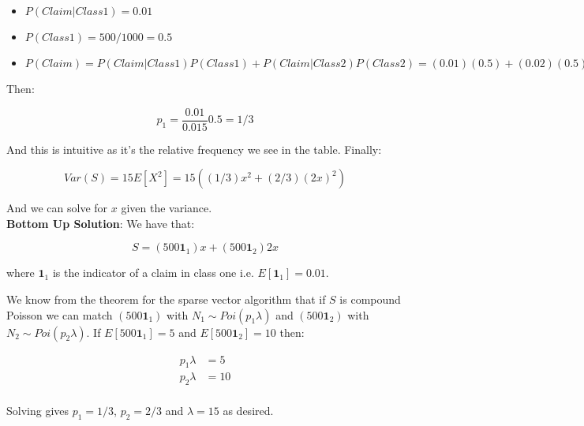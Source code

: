 \documentclass[10pt,a4paper]{article}
\begin{document}
\begin{itemize}

\item $P(Claim|Class1) =0.01$ 

\item $P(Class1)=500/1000 = 0.5$

\item $P(Claim) = P(Claim|Class1)P(Class1) + P(Claim|Class2)P(Class2) = (0.01)(0.5) + (0.02)(0.5)=0.015$

\end{itemize}

Then:

$$p_1 = \frac{0.01}{0.015} 0.5 = 1/3$$

And this is intuitive as it's the relative frequency we see in the table. Finally:

$$Var(S) = 15 E[X^2] = 15( (1/3) x^2 + (2/3)(2x)^2 )$$

And we can solve for $x$ given the variance. \\

\noindent\textbf{Bottom Up Solution}: We have that:

$$ S = (500 \mathbf{1}_1) x +  (500 \mathbf{1}_2) 2x$$

where $\mathbf{1}_1$ is the indicator of a claim in class one i.e. $E[\mathbf{1}_1]=0.01$.

We know from the theorem for the sparse vector algorithm that if $S$ is compound Poisson we can match $(500 \mathbf{1}_1)$ with $N_1 \sim Poi(p_1 \lambda)$ and  $(500 \mathbf{1}_2)$ with $N_2 \sim Poi(p_2 \lambda)$. If $E[500 \mathbf{1}_1]=5$ and $E[500 \mathbf{1}_2]=10$ then:

\begin{align*}
p_1 \lambda &= 5 \\
p_2 \lambda &=10 \\
\end{align*}

Solving gives $p_1 =1/3$, $p_2=2/3$ and $\lambda=15$ as desired.
\end{document}
